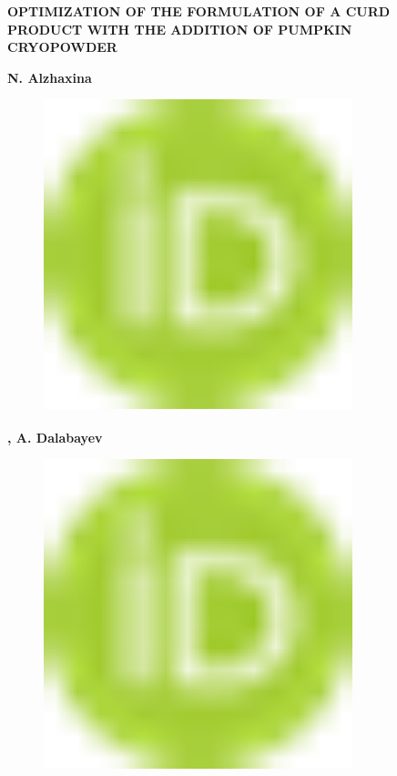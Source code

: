 
{\bfseries OPTIMIZATION OF THE FORMULATION OF A CURD PRODUCT WITH THE
ADDITION OF PUMPKIN CRYOPOWDER}

{\bfseries N.
Alzhaxina}
\begin{figure}[H]
	\centering
	\includegraphics[width=0.8\textwidth]{media/pish2/image10}
	\caption*{}
\end{figure}
{\bfseries \textsuperscript{\envelope },
A.
Dalabayev}
\begin{figure}[H]
	\centering
	\includegraphics[width=0.8\textwidth]{media/pish2/image10}
	\caption*{}
\end{figure}
